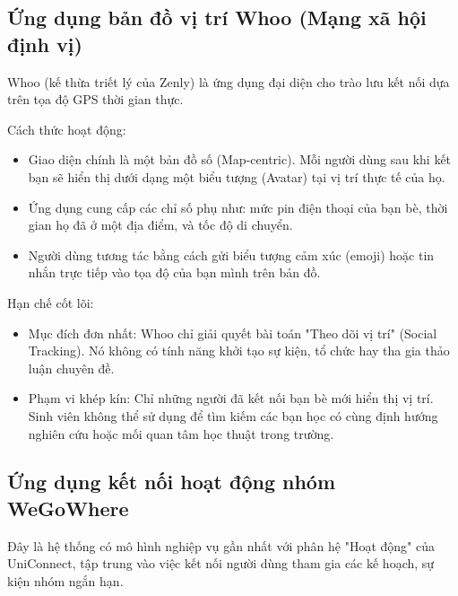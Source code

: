 \subsection{Ứng dụng bản đồ vị trí Whoo (Mạng xã hội định vị)}

Whoo (kế thừa triết lý của Zenly) là ứng dụng đại diện cho trào lưu kết nối dựa trên tọa độ GPS thời gian thực\cite{tang2010putting}.

Cách thức hoạt động: 

\begin{itemize}
    \item Giao diện chính là một bản đồ số (Map-centric). Mỗi người dùng sau khi kết bạn sẽ hiển thị dưới dạng một biểu tượng (Avatar) tại vị trí thực tế của họ.

    \item Ứng dụng cung cấp các chỉ số phụ như: mức pin điện thoại của bạn bè, thời gian họ đã ở một địa điểm, và tốc độ di chuyển.
    
    \item Người dùng tương tác bằng cách gửi biểu tượng cảm xúc (emoji) hoặc tin nhắn trực tiếp vào tọa độ của bạn mình trên bản đồ.
\end{itemize}

Hạn chế cốt lõi:

\begin{itemize}
    \item Mục đích đơn nhất: Whoo chỉ giải quyết bài toán "Theo dõi vị trí" (Social Tracking). Nó không có tính năng khởi tạo sự kiện, tổ chức hay tha gia thảo luận chuyên đề.

    \item Phạm vi khép kín: Chỉ những người đã kết nối bạn bè mới hiển thị vị trí. Sinh viên không thể sử dụng để tìm kiếm các bạn học có cùng định hướng nghiên cứu hoặc mối quan tâm học thuật trong trường.

\end{itemize}

\subsection{Ứng dụng kết nối hoạt động nhóm WeGoWhere}

Đây là hệ thống có mô hình nghiệp vụ gần nhất với phân hệ "Hoạt động" của UniConnect, tập trung vào việc kết nối người dùng tham gia các kế hoạch, sự kiện nhóm ngắn hạn\cite{sarker2021finding}.

